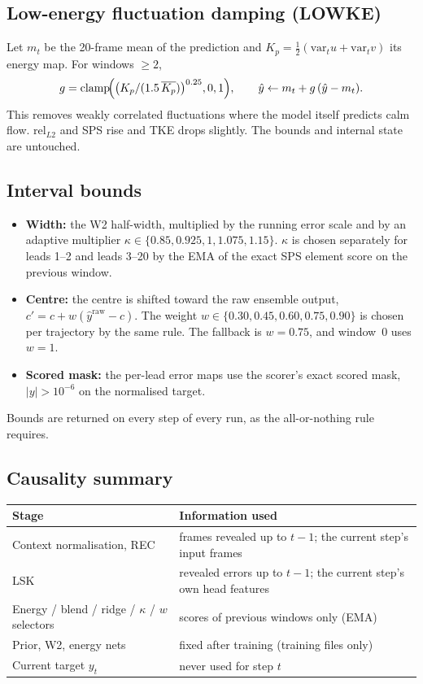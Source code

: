 \documentclass[10pt]{article}
\begin{document}
\subsection{Low-energy fluctuation damping (LOWKE)}
Let $m_t$ be the 20-frame mean of the prediction and $K_p=\tfrac12(\mathrm{var}_t u+\mathrm{var}_t v)$ its
energy map. For windows $\ge2$,
\begin{equation}
  g=\mathrm{clamp}\!\Bigl(\bigl(K_p/(1.5\,\overline{K_p})\bigr)^{0.25},0,1\Bigr),\qquad
  \hat y\leftarrow m_t+g\,(\hat y-m_t).
\end{equation}
This removes weakly correlated fluctuations where the model itself predicts calm flow. rel$_{L2}$ and SPS rise
and TKE drops slightly. The bounds and internal state are untouched.

\subsection{Interval bounds}
\begin{itemize}
\item \textbf{Width:} the W2 half-width, multiplied by the running error scale and by an adaptive multiplier
  $\kappa\in\{0.85,0.925,1,1.075,1.15\}$. $\kappa$ is chosen separately for leads 1--2 and leads 3--20 by the EMA
  of the exact SPS element score on the previous window.
\item \textbf{Centre:} the centre is shifted toward the raw ensemble output,
  $c'=c+w(\hat y^{\text{raw}}-c)$. The weight $w\in\{0.30,0.45,0.60,0.75,0.90\}$ is chosen per trajectory by the
  same rule. The fallback is $w=0.75$, and window~0 uses $w=1$.
\item \textbf{Scored mask:} the per-lead error maps use the scorer's exact scored mask,
  $|y|>10^{-6}$ on the normalised target.
\end{itemize}
Bounds are returned on every step of every run, as the all-or-nothing rule requires.

\subsection{Causality summary}
\begin{center}\small
\begin{tabular}{@{}p{5.2cm}p{9.8cm}@{}}\toprule
Stage & Information used \\\midrule
Context normalisation, REC & frames revealed up to $t-1$; the current step's input frames\\
LSK & revealed errors up to $t-1$; the current step's own head features\\
Energy / blend / ridge / $\kappa$ / $w$ selectors & scores of previous windows only (EMA)\\
Prior, W2, energy nets & fixed after training (training files only)\\
Current target $y_t$ & never used for step $t$\\\bottomrule
\end{tabular}
\end{center}
\end{document}
